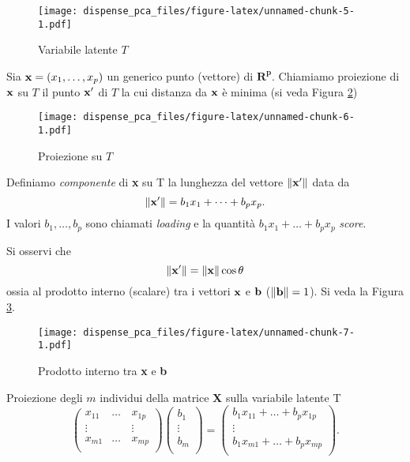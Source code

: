 \documentclass[
  11pt,
]{book}
\begin{document}
\begin{figure}
\centering
\texttt{[image: dispense\_pca\_files/figure-latex/unnamed-chunk-5-1.pdf]}
\caption{\label{fig:unnamed-chunk-5}Variabile latente \(T\)\label{fig:versore}}
\end{figure}

Sia \(\bold{x}=(x_1,\dots,x_p)\) un generico punto (vettore) di \(\mathbf{R^p}\).
Chiamiamo proiezione di \(\bold{x}\) su \(T\) il punto \(\bold{x'}\) di \(T\) la
cui distanza da \(\bold{x}\) è minima (si veda Figura \ref{fig:proiezione})

\begin{figure}
\centering
\texttt{[image: dispense\_pca\_files/figure-latex/unnamed-chunk-6-1.pdf]}
\caption{\label{fig:unnamed-chunk-6}Proiezione su \(T\)\label{fig:proiezione}}
\end{figure}

Definiamo \emph{componente} di \textbf{x} su T la lunghezza del vettore \(\|\bold{x'} \|\) data da
\begin{equation}
\|\bold{x'}\|=b_1x_1+\dots+b_px_p.
\end{equation}
I valori \(b_1,\dots,b_p\) sono chiamati \emph{loading} e la quantità
\(b_1x_1+\dots+b_px_p\) \emph{score}.

Si osservi che
\begin{equation}
\| \bold{x'} \|=\|\bold{x} \|\cos \theta
\end{equation}
ossia al prodotto interno (scalare) tra i vettori \(\bold{x}\) e \(\bold{b}\) (\(\| \bold{b}\|=1\)).
Si veda la Figura \ref{fig:prodinterno}.

\begin{figure}
\centering
\texttt{[image: dispense\_pca\_files/figure-latex/unnamed-chunk-7-1.pdf]}
\caption{\label{fig:unnamed-chunk-7}Prodotto interno tra \textbf{x} e \textbf{b} \label{fig:prodinterno}}
\end{figure}

Proiezione degli \(m\) individui della matrice \textbf{X} sulla variabile latente T
\begin{equation}
\left(
\begin{array}{cccc}
x_{11}  & \dots & x_{1p} \\
\vdots & \quad & \vdots \\
x_{m1} & \dots & x_{mp} \\
\end{array}
\right)
\left(
\begin{array}{c}
b_1 \\
\vdots \\
b_m \\
\end{array}
\right)
=
\left(
\begin{array}{cccc}
b_1x_{11}  + \dots +b_p x_{1p} \\
\vdots   \\
b_1x_{m1} + \dots + b_px_{mp} \\
\end{array}
\right).
\end{equation}
\end{document}
